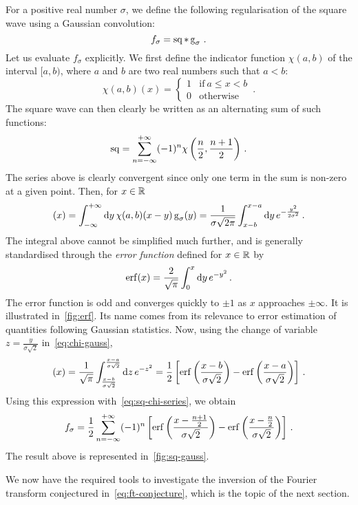 \begin{example}
  For a positive real number $\sigma$, we define the following regularisation of the
  square wave using a Gaussian convolution:
  \begin{equation}
    f_\sigma=\operatorname{sq}\ast\operatorname{g}_\sigma\,.\label{eq:sq-gauss}
  \end{equation}
  Let us evaluate $f_\sigma$ explicitly. We first define the indicator function
  $\chi(a,b)$ of the interval $[a,b)$, where $a$ and $b$ are two real numbers such that
  $a<b$:
  \begin{equation}
    \chi(a,b)(x)=
    \begin{cases}
      1&\text{if}~a\leq x<b\\
      0&\text{otherwise}
    \end{cases}\,.
  \end{equation}
  The square wave can then clearly be written as an alternating sum of such functions:
  \begin{equation}
    \operatorname{sq}=\sum_{n=-\infty}^{+\infty}(-1)^{n}\chi\left(\frac{n}{2},\frac{n+1}{2}\right)\,.
    \label{eq:sq-chi-series}
  \end{equation}
  The series above is clearly convergent since only one term in the sum is non-zero at a
  given point. Then, for $x\in\mathbb{R}$
  \begin{equation}
    [\chi(a,b)\ast\gauss_\sigma](x)=\intr{y}\chi(a,b)(x-y)\gauss_\sigma(y)
    =\frac{1}{\sigma\sqrt{2\pi}}\int_{x-b}^{x-a}\diff y\,e^{-\frac{y^2}{2\sigma^2}}\,.
    \label{eq:chi-gauss}
  \end{equation}
  The integral above cannot be simplified much further, and is generally standardised
  through the \emph{error function} defined for $x\in\mathbb{R}$ by
  \begin{equation}
    \operatorname{erf}(x)=\frac{2}{\sqrt{\pi}}\int_0^x\mathrm{d} y\,e^{-y^2}\,.\label{eq:erf}
  \end{equation}
  The error function is odd and converges quickly to $\pm 1$ as $x$ approaches
  $\pm\infty$. It is illustrated in~\cref{fig:erf}. Its name comes from its relevance to
  error estimation of quantities following Gaussian statistics. Now, using the change of
  variable $z=\frac{y}{\sigma\sqrt{2}}$ in~\cref{eq:chi-gauss},
  \begin{equation}
    [\chi(a,b)\ast\gauss_\sigma](x)=\frac{1}{\sqrt{\pi}}
    \int_{\frac{x-b}{\sigma\sqrt{2}}}^{\frac{x-a}{\sigma\sqrt{2}}}\diff z\,e^{-z^2}
    =\frac{1}{2}\left[\erf\left(\frac{x-b}{\sigma\sqrt{2}}\right)
    -\erf\left(\frac{x-a}{\sigma\sqrt{2}}\right)\right]\,.
  \end{equation}
  Using this expression with~\cref{eq:sq-chi-series}, we obtain
  \begin{equation}
    f_\sigma=\frac{1}{2}\sum_{n=-\infty}^{+\infty}(-1)^{n}
    \left[\operatorname{erf}\bigg(\frac{x-\frac{n+1}{2}}{\sigma\sqrt{2}}\bigg)
    -\operatorname{erf}\bigg(\frac{x-\frac{n}{2}}{\sigma\sqrt{2}}\bigg)\right]\,.
    \label{eq:sq-gauss-exp}
  \end{equation}
  The result above is represented in~\cref{fig:sq-gauss}.
\end{example}
We now have the required tools to investigate the inversion of the Fourier transform
conjectured in~\cref{eq:ft-conjecture}, which is the topic of the next section.
